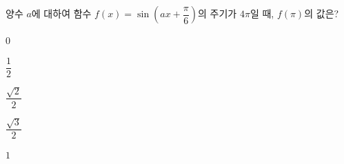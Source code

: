 양수 $a$에 대하여 함수 $f(x)=\sin\left(ax+\dfrac{\pi}{6}\right)$의 주기가 $4\pi$일 때, $f(\pi)$의 값은?
\begin{choices32}{\rule[-3ex]{0pt}{8ex}$0$}{\rule[-3ex]{0pt}{8ex}$\dfrac{1}{2}$}{\rule[-3ex]{0pt}{8ex}$\dfrac{\sqrt{2}}{2}$}{\rule[-3ex]{0pt}{8ex}$\dfrac{\sqrt{3}}{2}$}{\rule[-3ex]{0pt}{8ex}$1$}\end{choices32}
